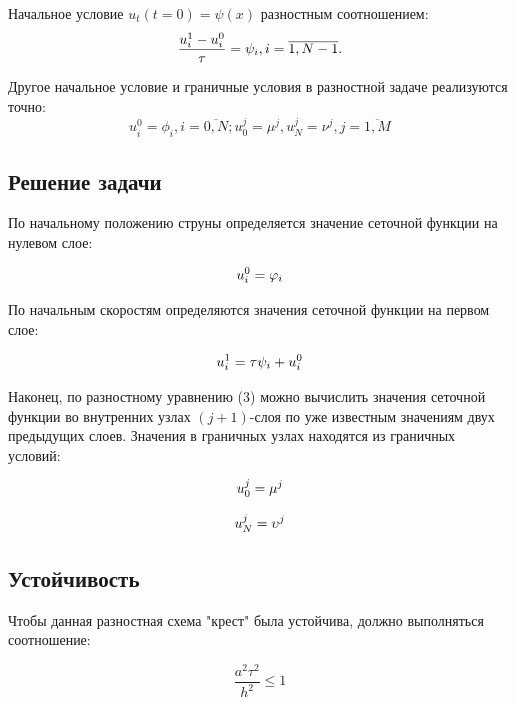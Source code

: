 \documentclass[a4paper,12pt]{article}
\begin{document}
Начальное условие $u_t(t=0) = \psi(x) $ разностным соотношением:
\begin{equation}
\frac{u_i^1-u_i^0}{\tau}=\psi_i, i=\overline{1,N-1}.\\
\end{equation}

Другое начальное условие и граничные условия в разностной задаче реализуются точно:
\begin{equation}
u_i^0=\phi_i, i=\overline{0,N}; u_0^j=\mu^j, u_N^j=\nu^j, j=\overline{1,M}
\end{equation}

\subsection{Решение задачи}

По начальному положению струны определяется значение сеточной функции на нулевом слое:

\begin{equation}
u^0_i = \varphi_i \\
\end{equation}

По начальным скоростям определяются значения сеточной функции на первом слое:

\begin{equation}
u^1_i = \tau \psi_i + u^0_i \\
\end{equation}

Наконец, по разностному уравнению (3) можно вычислить значения сеточной функции во внутренних узлах $(j+1)$-слоя по уже известным значениям двух предыдущих слоев.
Значения в граничных узлах находятся из граничных условий:

\begin{equation}
u^j_0 = \mu^j \\
\end{equation}

\begin{equation}
u^j_N = \upsilon^j \\
\end{equation}

\subsection{Устойчивость}

Чтобы данная разностная схема "крест" была устойчива, должно выполняться соотношение:

\begin{equation}
\frac{a^2 \tau^2}{h^2} \leq 1
\end{equation}
\end{document}
